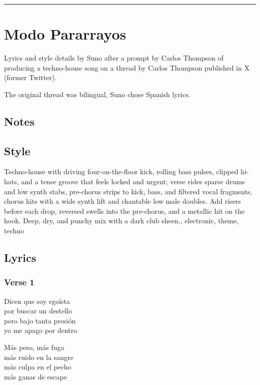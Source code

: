 \begin{center}\rule{0.5\linewidth}{0.5pt}\end{center}

\section{Modo Pararrayos}\label{modo-pararrayos}

Lyrics and style details by Suno after a prompt by Carlos Thompson of
producing a techno-house song on a thread by Carlos Thompson published
in X (former Twitter).

The original thread was bilingual, Suno chose Spanish lyrics.

\subsection{Notes}\label{notes-6}

\subsection{Style}\label{style-6}

Techno-house with driving four-on-the-floor kick, rolling bass pulses,
clipped hi-hats, and a tense groove that feels locked and urgent; verse
rides sparse drums and low synth stabs, pre-chorus strips to kick, bass,
and filtered vocal fragments, chorus hits with a wide synth lift and
chantable low male doubles. Add risers before each drop, reversed swells
into the pre-chorus, and a metallic hit on the hook. Deep, dry, and
punchy mix with a dark club sheen., electronic, theme, techno

\subsection{Lyrics}\label{lyrics-6}

\subsubsection{Verse 1}\label{verse-1-3}

Dicen que soy egoísta\\
por buscar un destello\\
pero bajo tanta presión\\
yo me apago por dentro

Más peso, más fuga\\
más ruido en la sangre\\
más culpa en el pecho\\
más ganas de escape

